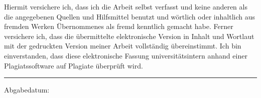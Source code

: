 \vspace*{\fill}  
Hiermit versichere ich, dass ich die Arbeit selbst verfasst und keine anderen als die angegebenen Quellen und Hilfsmittel benutzt und wörtlich oder inhaltlich aus fremden Werken Übernommenes als fremd kenntlich gemacht habe. Ferner versichere ich, dass die übermittelte elektronische Version in Inhalt und Wortlaut mit der gedruckten Version meiner Arbeit vollständig übereinstimmt. Ich bin einverstanden, dass diese elektronische Fassung universitätsintern anhand einer Plagiatssoftware auf Plagiate überprüft wird.

\vspace{1cm}


\par\noindent\rule{0.3\textwidth}{0.1pt}
\newline
Abgabedatum:
\vspace*{\fill}